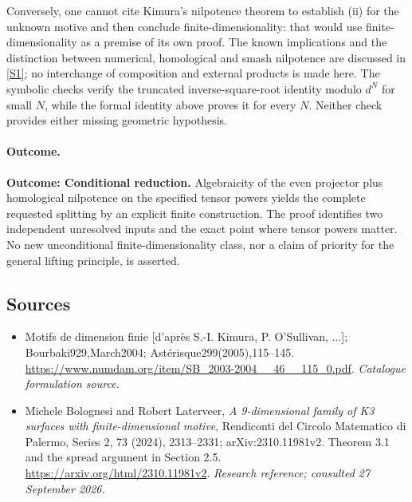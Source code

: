 \documentclass[11pt,a4paper]{article}
\newcommand{\sref}[2]{\hyperlink{source:#1:#2}{[S#2]}}
\numberwithin{equation}{section}
\begin{document}
Conversely, one cannot cite Kimura's nilpotence theorem to establish (ii) for the unknown motive and then conclude finite-dimensionality: that would use finite-dimensionality as a premise of its own proof. The known implications and the distinction between numerical, homological and smash nilpotence are discussed in \sref{statement}{1}; no interchange of composition and external products is made here. The symbolic checks verify the truncated inverse-square-root identity modulo $d^N$ for small $N$, while the formal identity above proves it for every $N$. Neither check provides either missing geometric hypothesis.

\paragraph{Outcome.}
\textbf{Outcome: Conditional reduction.}
Algebraicity of the even projector plus homological nilpotence on the specified tensor powers yields the complete requested splitting by an explicit finite construction. The proof identifies two independent unresolved inputs and the exact point where tensor powers matter. No new unconditional finite-dimensionality class, nor a claim of priority for the general lifting principle, is asserted.

\subsection{Sources}
\begin{itemize}\raggedright
\item[\textnormal{[S1]}]\hypertarget{source:statement:1}{} Motifs de dimension finie [d'après S.-I. Kimura, P. O'Sullivan, ...]; Bourbaki929,March2004; Astérisque299(2005),115–145.
\url{https://www.numdam.org/item/SB_2003-2004__46__115_0.pdf}.
{\small\textit{Catalogue formulation source.}}
\item[\textnormal{[E1]}]\hypertarget{extra:statement:1}{} Michele Bolognesi and Robert Laterveer, \emph{A 9-dimensional family of K3 surfaces with finite-dimensional motive}, Rendiconti del Circolo Matematico di Palermo, Series 2, 73 (2024), 2313--2331; arXiv:2310.11981v2. Theorem 3.1 and the spread argument in Section 2.5.
\url{https://arxiv.org/html/2310.11981v2}.
{\small\textit{Research reference; consulted 27 September 2026.}}
\end{itemize}
\end{document}
